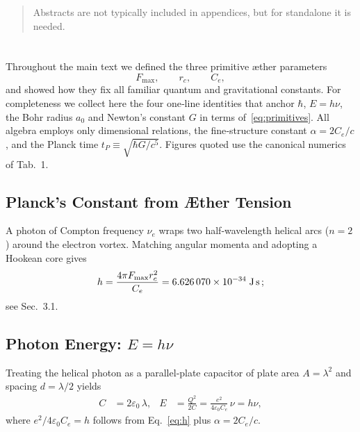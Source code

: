 \documentclass[12pt]{article}
\begin{document}
  \titlepageOpen

  \begin{abstract}
      Abstracts are not typically included in appendices, but for standalone it is needed.
  \end{abstract}

  \titlepageClose
\fi

\section{\papertitle}
    Throughout the main text we defined the three primitive æther parameters
    \begin{equation}
    F_{\max}, \qquad r_c, \qquad C_e,
    \label{eq:primitives}
    \end{equation}
    and showed how they fix all familiar quantum and gravitational constants.
    For completeness we collect here the four one‑line identities that anchor
    \(\hbar\), \(E=h\nu\), the Bohr radius \(a_0\) and Newton's constant \(G\)
    in terms of~\eqref{eq:primitives}.
    All algebra employs only dimensional relations, the fine‑structure constant
    \(\alpha=2C_e/c\), and the Planck time
    \(t_P\equiv\sqrt{\hbar G/c^{5}}\). Figures quoted use the canonical
    numerics of Tab.~1.

    \subsection{Planck's Constant from Æther Tension}
    A photon of Compton frequency \(\nu_e\) wraps two half‑wavelength
    helical arcs (\(n=2\)) around the electron vortex. Matching
    angular momenta and adopting a Hookean core gives
    \begin{equation}
        h = \frac{4\pi F_{\max} r_c^{2}}{C_e}
        = 6.626\,070\times10^{-34}\;\text{J\,s}\,;
        \label{eq:h}
    \end{equation}
    see Sec.~3.1.

    \subsection{Photon Energy: \(E=h\nu\)}
    Treating the helical photon as a parallel‑plate capacitor of plate area
    \(A=\lambda^{2}\) and spacing \(d=\lambda/2\) yields
    \begin{align}
        C &= 2\varepsilon_0\,\lambda, &
        E &= \frac{Q^{2}}{2C} = \frac{e^{2}}{4\varepsilon_{0}C_e}\,\nu
        = h\nu,
        \label{eq:Einstein}
    \end{align}
    where \(e^{2}/4\varepsilon_{0}C_e=h\) follows from Eq.~\eqref{eq:h} plus
    \(\alpha=2C_e/c\).
\end{document}
